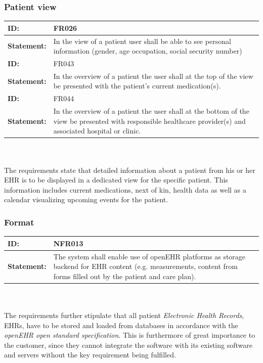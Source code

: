 \documentclass{article}
\begin{document}
\subsubsection{Patient view}

\begin{tabularx}{\linewidth}{| l | X |}
 \hline
 \textbf{ID:} & FR026  \\ 
 \hline
 \textbf{Statement:} & In the view of a patient user shall be able to see personal information (gender, age occupation, social security number) 
 \\ 

 \hline
 \textbf{ID:} & FR043  \\ 
 \hline
 \textbf{Statement:} & In the overview of a patient the user shall at the top of the view be presented with the patient’s current medication(s).
 \\ 
 \hline

 \hline
 \textbf{ID:} & FR044  \\ 
 \hline
 \textbf{Statement:} & In the overview of a patient the user shall at the bottom of the view be presented with responsible healthcare provider(s) and associated hospital or clinic.
 \\ 
 \hline
\end{tabularx}
\\ \\

The requirements state that detailed information about a patient from his or her EHR is to be displayed in a dedicated view for the specific patient. This information includes current medications, next of kin, health data as well as a calendar visualizing upcoming events for the patient.

\subsubsection{Format}
\begin{tabularx}{\linewidth}{| l | X |}
 \hline
 \textbf{ID:} & NFR013  \\ 
 \hline
 \textbf{Statement:} & The system shall enable use of openEHR platforms as storage backend for EHR content (e.g. measurements, content from forms filled out by the patient and care plan).
 \\ 
 \hline
\end{tabularx}
\\ \\

The requirements further stipulate that all patient \emph{Electronic Health Records}, EHRs, have to be stored and loaded from databases in accordance with the \emph{openEHR open standard specification}. This is furthermore of great importance to the customer, since they cannot integrate the software with its existing software and servers without the key requirement being fulfilled.
\end{document}

